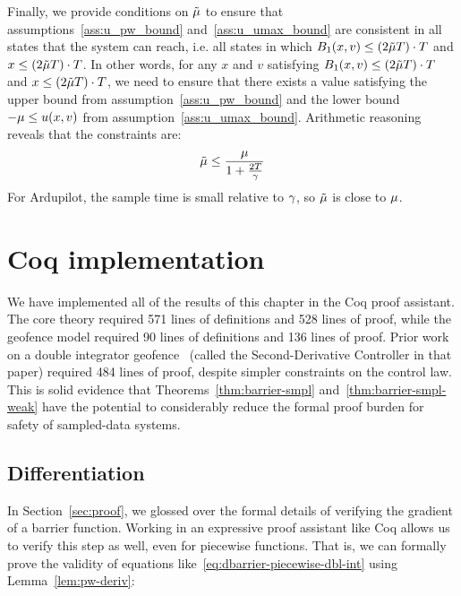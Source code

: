 Finally, we provide conditions on $\tilde{\mu}$ to ensure that
assumptions~\ref{ass:u_pw_bound} and~\ref{ass:u_umax_bound} are consistent
in all states that the system can reach, i.e. all states in which $B_1
(x,v) \leq (2\tilde{\mu} T) \cdot T$ and $x \leq (2\tilde{\mu} T) \cdot T$. In
other words, for any $x$ and $v$ satisfying $B_1 (x,v) \leq (2\tilde{\mu} T)
\cdot T$ and $x \leq (2\tilde{\mu} T) \cdot T$, we need to ensure that there
exists a value satisfying the upper bound from
assumption~\ref{ass:u_pw_bound} and the lower bound $-\mu \leq u(x,v)$
from assumption~\ref{ass:u_umax_bound}. Arithmetic reasoning reveals that
the constraints are:
\begin{equation}
\tilde{\mu} \leq \frac{\mu}{1 + \frac{2T}{\gamma}}
\end{equation}
For Ardupilot, the sample time is small relative to $\gamma$, so $\tilde{\mu}$ is
close to $\mu$.

\section{Coq implementation}
\label{sec:coq}
We have implemented all of the results of this chapter in the Coq proof
assistant. The core theory required 571 lines of definitions and 528 lines
of proof, while the geofence model required 90 lines of definitions and 136
lines of proof. Prior work on a double integrator
geofence~\cite{ricketts2016composition} (called the Second-Derivative
Controller in that paper) required 484 lines of proof, despite simpler
constraints on the control law. This is solid evidence that
Theorems~\ref{thm:barrier-smpl} and~\ref{thm:barrier-smpl-weak} have the
potential to considerably reduce the formal proof burden for safety of
sampled-data systems.

\subsection{Differentiation}
\label{sec:differentiation}
In Section~\ref{sec:proof}, we glossed over the formal details of verifying
the gradient of a barrier function. Working in an expressive proof
assistant like Coq allows us to verify this step as well, even for
piecewise functions. That is, we can formally prove the validity of
equations like~\eqref{eq:dbarrier-piecewise-dbl-int} using
Lemma~\ref{lem:pw-deriv}:

